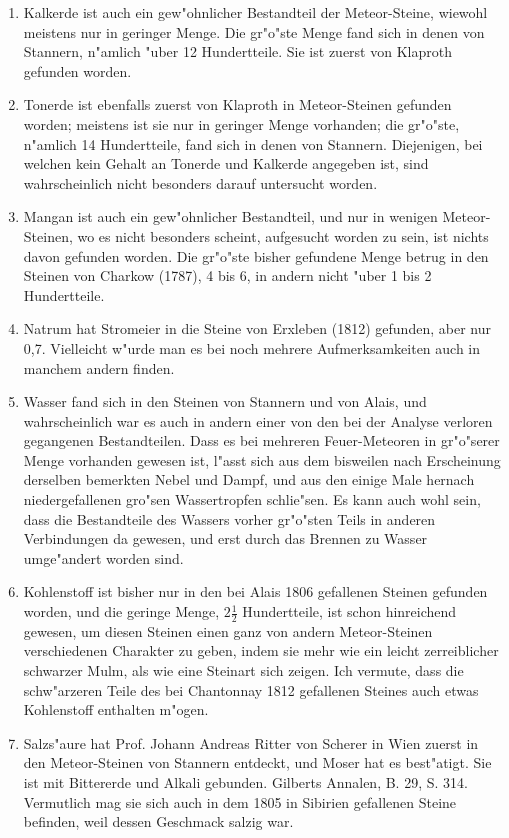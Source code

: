 \documentclass[a4paper, 11pt, oneside, polutonikogreek, german]{article}
\begin{document}
\begin{enumerate}
  \item Kalkerde ist auch ein gew"ohnlicher Bestandteil der Meteor-Steine, wiewohl meistens nur in geringer Menge. Die gr"o"ste Menge fand sich in denen von Stannern, n"amlich "uber 12 Hundertteile. Sie ist zuerst von Klaproth gefunden worden.
  \item Tonerde ist ebenfalls zuerst von Klaproth in Meteor-Steinen gefunden worden; meistens ist sie nur in geringer Menge vorhanden; die gr"o"ste, n"amlich 14 Hundertteile, fand sich in denen von Stannern. Diejenigen, bei welchen kein Gehalt an Tonerde und Kalkerde angegeben ist, sind wahrscheinlich nicht besonders darauf untersucht worden.
  \item Mangan ist auch ein gew"ohnlicher Bestandteil, und nur in wenigen Meteor-Steinen, wo es nicht besonders scheint, aufgesucht worden zu sein, ist nichts davon gefunden worden. Die gr"o"ste bisher gefundene Menge betrug in den Steinen von Charkow (1787), 4 bis 6, in andern nicht "uber 1 bis 2 Hundertteile.
  \item Natrum hat Stromeier in die Steine von Erxleben (1812) gefunden, aber nur 0,7. Vielleicht w"urde man es bei noch mehrere Aufmerksamkeiten auch in manchem andern finden.
  \item Wasser fand sich in den Steinen von Stannern und von Alais, und wahrscheinlich war es auch in andern einer von den bei der Analyse verloren gegangenen Bestandteilen. Dass es bei mehreren Feuer-Meteoren in gr"o"serer Menge vorhanden gewesen ist, l"asst sich aus dem bisweilen nach Erscheinung derselben bemerkten Nebel und Dampf, und aus den einige Male hernach niedergefallenen gro"sen Wassertropfen schlie"sen. Es kann auch wohl sein, dass die Bestandteile des Wassers vorher gr"o"sten Teils in anderen Verbindungen da gewesen, und erst durch das Brennen zu Wasser umge"andert worden sind.
  \item Kohlenstoff ist bisher nur in den bei Alais 1806 gefallenen Steinen gefunden worden, und die geringe Menge, $\mathfrak{2\frac{1}{2}}$ Hundertteile, ist schon hinreichend gewesen, um diesen Steinen einen ganz von andern Meteor-Steinen verschiedenen Charakter zu geben, indem sie mehr wie ein leicht zerreiblicher schwarzer Mulm, als wie eine Steinart sich zeigen. Ich vermute, dass die schw"arzeren Teile des bei Chantonnay 1812 gefallenen Steines auch etwas Kohlenstoff enthalten m"ogen.
  \item Salzs"aure hat Prof. Johann Andreas Ritter von Scherer in Wien zuerst in den Meteor-Steinen von Stannern entdeckt, und Moser hat es best"atigt. Sie ist mit Bittererde und Alkali gebunden. Gilberts Annalen, B. 29, S. 314. Vermutlich mag sie sich auch in dem 1805 in Sibirien gefallenen Steine befinden, weil dessen Geschmack salzig war.
\end{enumerate}
\end{document}
